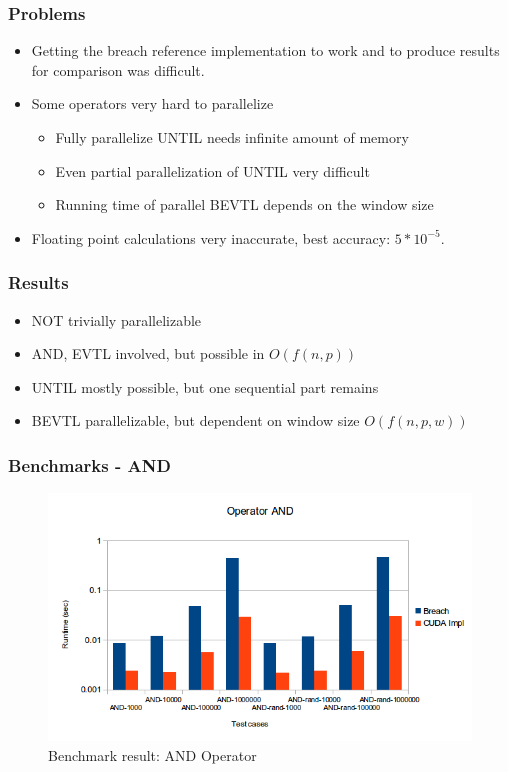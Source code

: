 \documentclass[notes=show]{beamer}
\begin{document}
\begin{frame}
\frametitle{Problems}
\begin{itemize}
\item Getting the breach reference implementation to work and to produce results for
        comparison was difficult.
\item Some operators very hard to parallelize
\begin{itemize}
\item Fully parallelize UNTIL needs infinite amount of memory
\item Even partial parallelization of UNTIL very difficult
\item Running time of parallel BEVTL depends on the window size
\end{itemize}
\item Floating point calculations very inaccurate, best accuracy: $5*10^{-5}$.
\end{itemize}
\end{frame}

\begin{frame}
\frametitle{Results}
\begin{itemize}
\item NOT trivially parallelizable
\item AND, EVTL involved, but possible in $O(f(n,p))$
\item UNTIL mostly possible, but one sequential part remains
\item BEVTL parallelizable, but dependent on window size $O(f(n,p,w))$
\end{itemize}
\end{frame}

\begin{frame}
\frametitle{Benchmarks - AND}
\begin{figure}[H]
    \includegraphics[scale=0.5]{bm_and.png}
    \caption{
        \label{fig:bm_and}
        Benchmark result: AND Operator}
\end{figure}
\end{frame}
\end{document}
